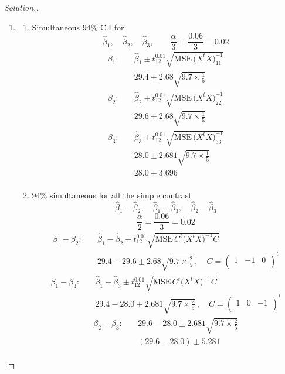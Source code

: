 \documentclass[11pt,a4paper]{article}
\theoremstyle{definition}
\newenvironment{solution}
  {\renewcommand{\qedsymbol}{}\begin{proof}[\textit{Solution}.]}
  {\end{proof}}
\begin{document}
\begin{solution}
\begin{enumerate}
\item
\begin{enumerate}
      \item Simultaneous $94\%$ C.I for $$\widehat{\beta}_1,\quad \widehat{\beta}_2,\quad  \widehat{\beta}_3,\qquad  \frac{\alpha}{3}=\frac{0.06}{3}=0.02$$
\begin{align*}
\beta_1 :\quad  &  \widehat{\beta}_1 \pm t^{0.01}_{12}\sqrt{\text{MSE}\,\big(X^tX\big)^{-1}_{11}}\\
          & 29.4\pm 2.68\sqrt{9.7\times \frac{1}{5}}
\end{align*}
\begin{align*}
\beta_2 :\quad  & \widehat{\beta}_2 \pm t^{0.01}_{12}\sqrt{\text{MSE}\,\big(X^tX\big)^{-1}_{22}}\\
          & 29.6 \pm 2.68 \sqrt{9.7\times \frac{1}{5}}
\end{align*}
\begin{align*}
\beta_3 :\quad  & \widehat{\beta}_3 \pm t^{0.01}_{12}\sqrt{\text{MSE}\,\big(X^tX\big)^{-1}_{33}}\\
          & 28.0 \pm 2.681\sqrt{9.7\times \frac{1}{5}}\\
          & 28.0 \pm 3.696\\
\end{align*}

         \item $94\%$ simultaneous for all the simple contrast $$\widehat{\beta}_1-\widehat{\beta}_2,\quad  \widehat{\beta}_1-\widehat{\beta}_3,\quad  \widehat{\beta}_2-\widehat{\beta}_3$$ 
         $$\frac{\alpha}{2}=\frac{0.06}{3}=0.02$$
\begin{align*}
\beta_1-\beta_2:\quad  & \widehat{\beta}_1-\widehat{\beta}_2 \pm t^{0.01}_{12}\sqrt{\text{MSE}\,C^t\big(X^tX\big)^{-1}C}\\
                 & 29.4-29.6 \pm 2.68\sqrt{9.7\times \frac{2}{5}}\,,\quad  C=
\begin{pmatrix}
1 & -1 & 0\\
\end{pmatrix}^t
\end{align*}
\begin{align*}
\beta_1-\beta_3:\quad  & \widehat{\beta}_1-\widehat{\beta}_3 \pm t^{0.01}_{12}\sqrt{\text{MSE}\,C^t\big(X^tX\big)^{-1}C}\\
                 & 29.4-28.0 \pm 2.681\sqrt{9.7\times \frac{2}{5}}\,,\quad  C=
\begin{pmatrix}
1 & 0 & -1\\
\end{pmatrix}^t
\end{align*}
\begin{align*}
\beta_2-\beta_3 :\quad  & 29.6-28.0 \pm 2.681\sqrt{9.7\times \frac{2}{5}}\\
                  & (29.6-28.0)\pm 5.281\\
\end{align*}
\end{enumerate}
\end{enumerate}
\end{solution}
\end{document}
